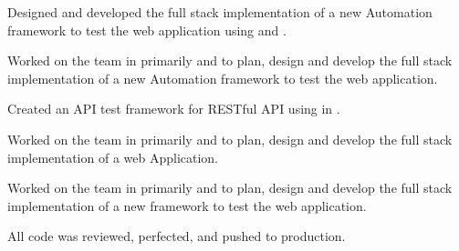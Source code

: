 \documentclass[]{openfont}
\begin{document}
\begin{minipage}[t]{0.66\textwidth}
\begin{tightemize}
\item Designed and developed the full stack implementation of a new Automation framework to test the web application using  and .
\end{tightemize}
\sectionsep

\begin{tightemize}
\item Worked on the \href{https://www.xpo.com/solutions/transportation/last-mile}{} team in primarily  and  to plan, design and develop the full stack implementation of a new Automation framework to test the web application.
\item Created an API test framework for RESTful API using  in .
\end{tightemize}
\sectionsep

\begin{tightemize}
\item Worked on the  team in primarily  and  to plan, design and develop the full stack implementation of a web Application.
\item Worked on the   team in primarily  and  to plan, design and develop the full stack implementation of a new framework to test the web application.
\item All code was reviewed, perfected, and pushed to production.
\end{tightemize}
\sectionsep




\end{minipage}
\end{document}
